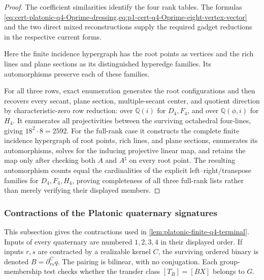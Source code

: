 \documentclass[11pt,letterpaper,onecolumn]{article}
\theoremstyle{plain}
\theoremstyle{definition}
\theoremstyle{remark}
\begin{document}
\begin{proof}
The coefficient similarities identify the four rank tables.
The formulas
\cref{eq:cert-platonic-q4-Oprime-dressing,eq:p1-cert-q4-Oprime-eight-vertex-vector}
and the two direct mixed reconstructions supply the required gadget reductions in the respective current forms.

Here the finite incidence hypergraph has the root points as vertices
and the rich lines and plane sections as its distinguished hyperedge families.
Its automorphisms preserve each of these families.

For all three rows, exact enumeration generates the root configurations and
then recovers every secant, plane section, multiple-secant center, and
quotient direction by characteristic-zero row reduction: over
\(\mathbb Q(i)\) for \(D_4,F_4\), and over
\(\mathbb Q(\phi,i)\) for \(H_4\).  It enumerates all projectivities between
the surviving octahedral four-lines, giving \(18^2\cdot8=2592\).
For the full-rank case it constructs the complete finite incidence
hypergraph of root points, rich lines, and plane sections, enumerates its
automorphisms, solves for the inducing projective linear map, and retains the
map only after checking both \(A\) and \(A^\sharp\) on every root point.
The resulting automorphism counts equal the cardinalities of the explicit
left--right/transpose families for \(D_4,F_4,H_4\), proving completeness of
all three full-rank lists rather than merely verifying their displayed
members.
\end{proof}

\subsubsection{Contractions of the Platonic quaternary signatures}
\label{proofsubsec:cert-platonic-q4-exits}

This subsection gives the contractions used in
\cref{lem:platonic-finite-q4-terminal}.  Inputs of every quaternary are numbered
\(1,2,3,4\) in their displayed order.  If inputs \(r,s\) are contracted by
a realizable kernel \(C\), the surviving ordered binary is denoted
\(B=\partial_{rs}^{C}q\).  The pairing is bilinear, with no conjugation.
Each group-membership test checks whether the transfer class \([T_B]=[BX]\) belongs to \(G\).
\end{document}
